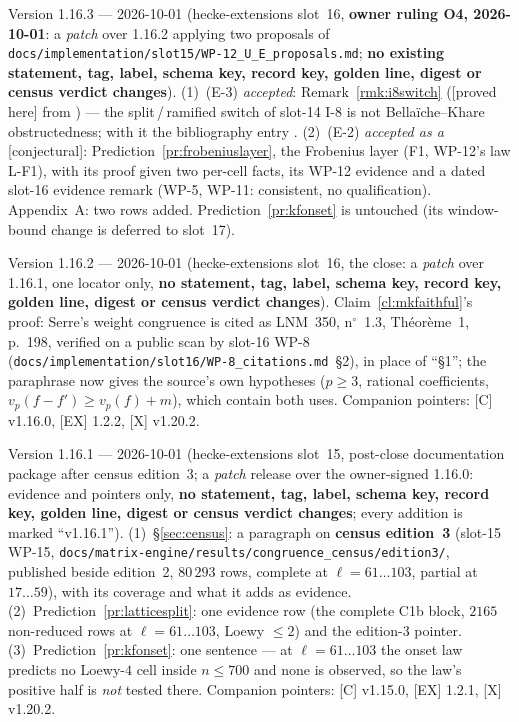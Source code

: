 \documentclass[11pt]{article}
\theoremstyle{remark}
\newcommand{\PROVED}{\textsf{[proved here]}}
\newcommand{\CONJ}{\textsf{[conjectural]}}
\begin{document}
Version 1.16.3 --- 2026-10-01 (hecke-extensions slot~16, \textbf{owner ruling O4, 2026-10-01}: a \emph{patch} over 1.16.2 applying two
proposals of \texttt{docs/implementation/slot15/WP-12\_U\_E\_proposals.md}; \textbf{no existing statement, tag, label, schema key, record key,
golden line, digest or census verdict changes}). (1)~(E-3) \emph{accepted}: Remark~\ref{rmk:i8switch} (\PROVED{} from \cite{bk}) --- the
split\,/\,ramified switch of slot-14 I-8 is not Bella\"iche--Khare obstructedness; with it the bibliography entry \cite{hho}.
(2)~(E-2) \emph{accepted as a} \CONJ: Prediction~\ref{pr:frobeniuslayer}, the Frobenius layer (F1, WP-12's law L-F1), with its
proof given two per-cell facts, its WP-12 evidence and a dated slot-16 evidence remark (WP-5, WP-11: consistent, no qualification).
Appendix~A: two rows added. Prediction~\ref{pr:kfonset} is untouched (its window-bound change is deferred to slot~17).

Version 1.16.2 --- 2026-10-01 (hecke-extensions slot~16, the close: a \emph{patch} over 1.16.1, one locator only, \textbf{no
statement, tag, label, schema key, record key, golden line, digest or census verdict changes}). Claim~\ref{cl:mkfaithful}'s proof: Serre's
weight congruence is cited as LNM~350, n$^\circ$~1.3, Th\'eor\`eme~1, p.~198, verified on a public scan by slot-16 WP-8
(\texttt{docs/implementation/slot16/WP-8\_citations.md}~\S2), in place of ``\S1''; the paraphrase now gives the source's own hypotheses
($p\ge3$, rational coefficients, $v_p(f-f')\ge v_p(f)+m$), which contain both uses. Companion pointers: [C] v1.16.0, [EX] 1.2.2, [X] v1.20.2.

Version 1.16.1 --- 2026-10-01 (hecke-extensions slot~15, post-close documentation package after census edition~3; a
\emph{patch} release over the owner-signed 1.16.0: evidence and pointers only, \textbf{no statement, tag, label, schema key, record key,
golden line, digest or census verdict changes}; every addition is marked ``v1.16.1''). (1)~\S\ref{sec:census}: a paragraph on
\textbf{census edition~3} (slot-15 WP-15, \texttt{docs/matrix-engine/results/congruence\_census/edition3/}, published beside edition~2,
$80\,293$ rows, complete at $\ell=61\ldots103$, partial at $17\ldots59$), with its coverage and what it adds as evidence.
(2)~Prediction~\ref{pr:latticesplit}: one evidence row (the complete C1b block, $2165$ non-reduced rows at $\ell=61\ldots103$, Loewy
$\le2$) and the edition-3 pointer. (3)~Prediction~\ref{pr:kfonset}: one sentence --- at $\ell=61\ldots103$ the onset law predicts no
Loewy-$4$ cell inside $n\le700$ and none is observed, so the law's positive half is \emph{not} tested there.
Companion pointers: [C] v1.15.0, [EX] 1.2.1, [X] v1.20.2.
\end{document}
